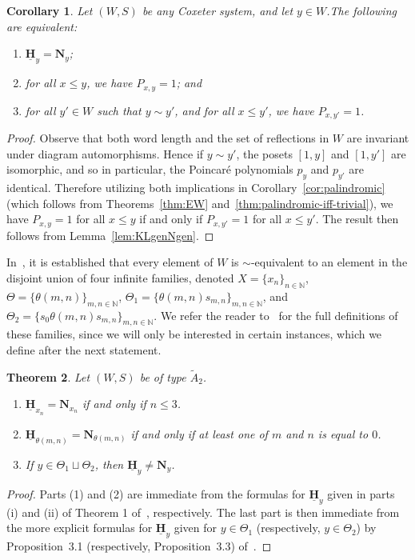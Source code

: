 \documentclass[11pt]{amsart}
\theoremstyle{plain}
\newtheorem{thm}{Theorem}[section]
\newtheorem{corollary}[thm]{Corollary}
\theoremstyle{definition}
\newcommand{\N}{\mathbb{N}}
\newcommand\KLbasis{\underline{\mathbf{H}}}
\newcommand\Ngen{\mathbf{N}}
\newcommand{\Pxy}{P_{x,y}} %
\numberwithin{equation}{subsection}
\begin{document}
\begin{corollary}\label{cor:diagram} 
Let $(W,S)$ be any Coxeter system, and let $y \in W$.The following are equivalent:
\begin{enumerate}
\item $\KLbasis_y = \Ngen_y$; 
\item for all $x \leq y$, we have $\Pxy = 1$; and
\item for all $y' \in W$ such that $y \sim y'$, and for all $x \leq y'$, we have $P_{x,y'} = 1$.
\end{enumerate}
\end{corollary}
\begin{proof} Observe that both word length and the set of reflections in $W$ are invariant under diagram automorphisms. Hence if $y \sim y'$, the posets $[1,y]$ and $[1,y']$ are isomorphic, and so in particular, the Poincar\'e polynomials $p_y$ and $p_{y'}$ are identical. Therefore utilizing both implications in Corollary~\ref{cor:palindromic} (which follows from Theorems~\ref{thm:EW} and~\ref{thm:palindromic-iff-trivial}), we have $\Pxy = 1$ for all $x \leq y$ if and only if $P_{x,y'} = 1$ for all $x \leq y'$. The result then follows from Lemma~\ref{lem:KLgenNgen}.
\end{proof}

In~\cite[Section 2.1]{BurrullLibedinskyPlaza}, it is established that every element of $W$ is $\sim$-equivalent to an element in the disjoint union of four infinite families, denoted $X = \{ x_n \}_{n \in \N}$, $\Theta = \{ \theta(m,n) \}_{m,n \in \N}$, $\Theta_1 = \{ \theta(m,n)s_{m,n} \}_{m,n \in \N}$, and $\Theta_2 = \{ s_0 \theta(m,n) s_{m,n} \}_{m,n \in \N}$. We refer the reader to~\cite{BurrullLibedinskyPlaza} for the full definitions of these families, since we will only be interested in certain instances, which we define after the next statement.

\begin{thm}\label{thm:LP} 
Let $(W,S)$ be of type $\tilde{A}_2$.
\begin{enumerate}
\item $\KLbasis_{x_n} = \Ngen_{x_n}$ if and only if $n \leq 3$.
\item $\KLbasis_{\theta(m,n)} = \Ngen_{\theta(m,n)}$ if and only if at least one of $m$ and $n$ is equal to $0$.
\item If $y \in \Theta_1 \sqcup \Theta_2$, then $\KLbasis_{y} \neq \Ngen_{y}$.
\end{enumerate}
\end{thm}
\begin{proof} Parts (1) and (2) are immediate from the formulas for $\KLbasis_y$ given in parts (i) and (ii) of Theorem 1 of~\cite{LibedinskyPatimo}, respectively. The last part is then immediate from the more explicit formulas for $\KLbasis_y$ given for $y \in \Theta_1$ (respectively, $y \in \Theta_2$)  by  Proposition~3.1 (respectively, Proposition~3.3) of~\cite{BurrullLibedinskyPlaza}.\end{proof}
\end{document}
